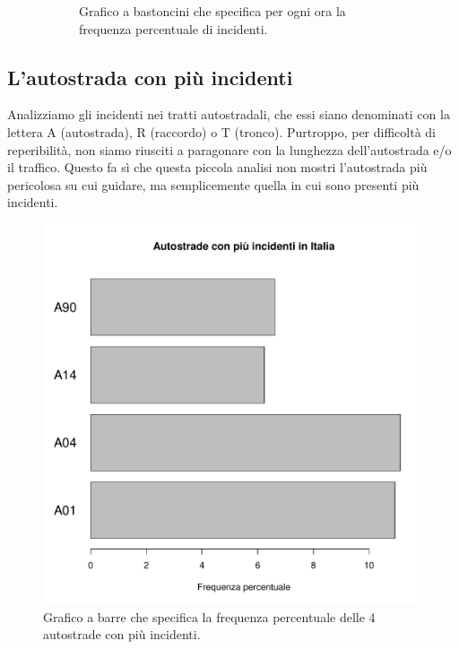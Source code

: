 \documentclass[12pt,a4paper,final,oneside]{article}			%
\begin{document}
\begin{figure}[t]
\begin{subfigure}{.48\textwidth}
                \caption{Grafico a bastoncini che specifica per ogni ora la frequenza percentuale di incidenti.}
                \label{Fig: incidenti_per_ora_barrette}
            \end{subfigure}
            \caption{}
        \end{figure}

\clearpage        
    \subsection{L'autostrada con più incidenti}
        Analizziamo gli incidenti nei tratti autostradali, che essi siano denominati con la lettera A (autostrada), R (raccordo) o T (tronco). Purtroppo, per difficoltà di reperibilità, non siamo riusciti a paragonare con la lunghezza dell'autostrada e/o il traffico. Questo fa sì che questa piccola analisi non mostri l'autostrada più pericolosa su cui guidare, ma semplicemente quella in cui sono presenti più incidenti.
        
        \begin{figure}[h!]
            \centering
            \includegraphics[scale=0.6]{./../results/maggiori_autostrade.pdf}
            \caption{Grafico a barre che specifica la frequenza percentuale delle 4 autostrade con più incidenti.}
            \label{Fig: incidenti_autostrade}
        \end{figure}
        
\end{document}
